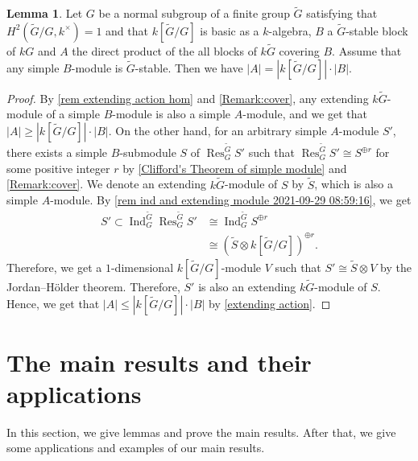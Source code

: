\documentclass[pdftex,a4paper]{article}
\numberwithin{equation}{subsection}
\theoremstyle{definition}
\newtheorem{lemma}[theorem]{Lemma}
\newcommand{\induc}{{\operatorname{Ind}\nolimits}}
\newcommand{\restr}{{\operatorname{Res}\nolimits}}
\begin{document}
\begin{lemma}\label{counting 2021-09-10 17:42:55}
	Let \(G\) be a normal subgroup of a finite group  \(\tilde{G}\) satisfying that \(H^2(\tilde{G}/G,k^\times)=1\) and that \(k[\tilde{G}/G]\) is basic as a \(k\)-algebra, \(B\) a \(\tilde{G}\)-stable block of \(kG\) and \(A\) the direct product of the all blocks of \(k\tilde{G}\) covering \(B\). Assume that any simple \(B\)-module is \(\tilde{G}\)-stable. Then we have \(|A|=|k[\tilde{G}/G]|\cdot|B|\).
\end{lemma}
\begin{proof}
	By \cref{rem extending action hom} and \cref{Remark:cover},
	any extending \(k\tilde{G}\)-module of a simple \(B\)-module is also a simple \(A\)-module, and we get that \(|A|\geq|k[\tilde{G}/G]|\cdot|B|\).
	On the other hand,
	for an arbitrary simple \(A\)-module \(S'\), there exists a simple \(B\)-submodule \(S\) of \(\restr_G^{\tilde{G}}S'\) such that \(\restr_G^{\tilde{G}}S'\cong S^{\oplus r}\) for some positive integer \(r\) by \cref{Clifford's Theorem of simple module} and \cref{Remark:cover}.
	We denote an extending \(k\tilde{G}\)-module of \(S\) by \(\tilde{S}\), which is also a simple \(A\)-module.
	By \cref{rem ind and extending module 2021-09-29 08:59:16}, we get
	\begin{align}
		S'\subset \induc_G^{\tilde{G}}\restr_G^{\tilde{G}} S'
		 & \cong\induc_G^{\tilde{G}}S^{\oplus r}               \\
		 & \cong (\tilde{S}\otimes k[\tilde{G}/G])^{\oplus r}.
	\end{align}
	Therefore, we get a \(1\)-dimensional \(k[\tilde{G}/G]\)-module \(V\) such that \(S'\cong \tilde{S}\otimes V\) by the Jordan--H\"{o}lder theorem.
	Therefore, \(S'\) is also an extending \(k\tilde{G}\)-module of \(S\).
	Hence, we get that \(|A|\leq|k[\tilde{G}/G]|\cdot|B|\) by \cref{extending action}.
\end{proof}

\section{The main results and their applications}
In this section, we give lemmas and prove the main results.
After that, we give some applications and examples of our main results.
\end{document}
